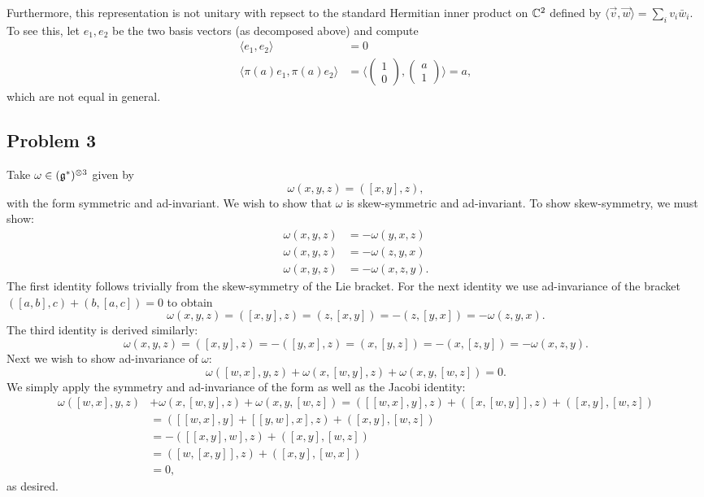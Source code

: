 \documentclass{../../mathnotes}
\begin{document}
Furthermore, this representation is not unitary with repsect to the standard Hermitian inner product on $\mathbb{C}^2$ defined by $\langle \vec v,\vec w\rangle=\sum_iv_i\bar w_i$.
To see this, let $e_1,e_2$ be the two basis vectors (as decomposed above) and compute
\begin{align*}
    \langle e_1,e_2\rangle&=0\\
    \langle \pi(a)e_1,\pi(a)e_2\rangle&=\langle\begin{pmatrix}1\\0\end{pmatrix},\begin{pmatrix}a\\1\end{pmatrix}\rangle=a,
\end{align*}
which are not equal in general.

\subsection*{Problem 3}

Take $\omega\in(\mathfrak g^*)^{\otimes 3}$ given by
\[\omega(x,y,z)=([x,y],z),\]
with the form symmetric and ad-invariant. We wish to show that $\omega$ is skew-symmetric and ad-invariant.
To show skew-symmetry, we must show:
\begin{align*}
    \omega(x,y,z)&=-\omega(y,x,z)\\
    \omega(x,y,z)&=-\omega(z,y,x)\\
    \omega(x,y,z)&=-\omega(x,z,y).
\end{align*}
The first identity follows trivially from the skew-symmetry of the Lie bracket. For the next identity we use ad-invariance of the bracket
$([a,b],c)+(b,[a,c])=0$ to obtain
\[\omega(x,y,z)=([x,y],z)=(z,[x,y])=-(z,[y,x])=-\omega(z,y,x).\]
The third identity is derived similarly:
\[\omega(x,y,z)=([x,y],z)=-([y,x],z)=(x,[y,z])=-(x,[z,y])=-\omega(x,z,y).\]
Next we wish to show ad-invariance of $\omega$:
\[\omega([w,x],y,z)+\omega(x,[w,y],z)+\omega(x,y,[w,z])=0.\]
We simply apply the symmetry and ad-invariance of the form as well as the Jacobi identity:
\begin{align*}
    \omega([w,x],y,z)&+\omega(x,[w,y],z)+\omega(x,y,[w,z])=([ [w,x],y],z)+([x,[w,y]],z)+([x,y],[w,z])\\
    &=([ [w,x],y]+[ [y,w],x],z)+([x,y],[w,z])\\
    &=-([ [x,y],w],z)+([x,y],[w,z])\\
    &=([ w,[x,y]],z)+([x,y],[w,x])\\&=0,
\end{align*}
as desired.
\end{document}
